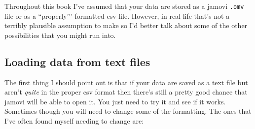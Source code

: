 \documentclass[
]{book}
\begin{document}
Throughout this book I've assumed that your data are stored as a jamovi \texttt{.omv} file or as a ``properly''' formatted csv file. However, in real life that's not a terribly plausible assumption to make so I'd better talk about some of the other possibilities that you might run into.

\hypertarget{loading-data-from-text-files}{%
\subsection{Loading data from text files}\label{loading-data-from-text-files}}

The first thing I should point out is that if your data are saved as a text file but aren't \emph{quite} in the proper csv format then there's still a pretty good chance that jamovi will be able to open it. You just need to try it and see if it works. Sometimes though you will need to change some of the formatting. The ones that I've often found myself needing to change are:
\end{document}
